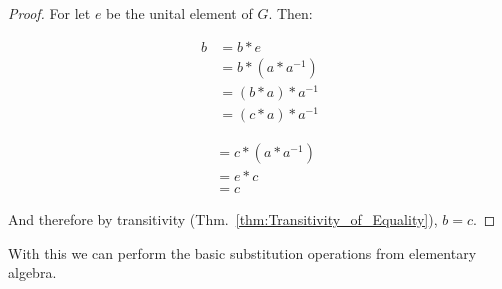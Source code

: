     \begin{proof}
        For let $e$ be the unital element of $G$. Then:
        \par\vspace{-2.5ex}
        \begin{minipage}[t]{0.49\textwidth}
            \centering
            \begin{align}
                b&=b*e
                \tag{Identity}\\
                &=b*(a*a^{\minus{1}})
                \tag{Inverse}\\
                &=(b*a)*a^{\minus{1}}
                \tag{Associativity}\\
                &=(c*a)*a^{\minus{1}}
                \tag{Hypothesis}
            \end{align}
        \end{minipage}
        \hfill
        \begin{minipage}[t]{0.49\textwidth}
            \centering
            \begin{align}
                &=c*(a*a^{\minus{1}})
                \tag{Associativity}\\
                &=e*c
                \tag{Inverse}\\
                &=c
                \tag{Identity}
            \end{align}
        \end{minipage}
        \par\vspace{2.5ex}
        And therefore by transitivity (Thm.~\ref{thm:Transitivity_of_Equality}),
        $b=c$.
    \end{proof}
    With this we can perform the basic substitution operations from elementary
    algebra.
